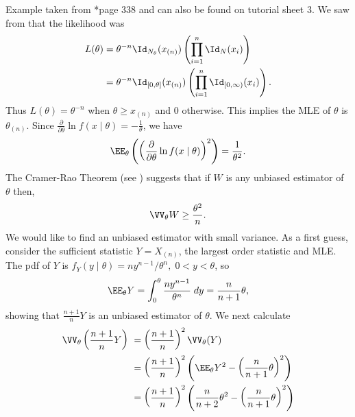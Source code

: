 \begin{exam} \label{exam: uni_ss_p2}
    Example taken from \cite{CasellaGeorge2001SI}*{page 338} and can also be found on tutorial sheet 3. We saw from  that the likelihood was
    \begin{align*}
        L (\theta) & = \theta^{-n} \Id_{N_\theta} (x_{(n)}) \left( \prod_{i=1}^{n} \Id_{N} (x_i) \right)             \\
                   & = \theta^{-n} \Id_{[0,\theta]} (x_{(n)}) \left( \prod_{i=1}^{n} \Id_{[0,\infty)} (x_i) \right).
    \end{align*}
    Thus $L (\theta) = \theta^{-n}$ when $\theta \geq x_{(n)}$ and $0$ otherwise. This implies the MLE of $\theta$ is $\theta_{(n)}$. Since $\frac{\partial}{\partial \theta} \ln f (x \mid \theta) = -\frac{1}{\theta}$, we have
    \begin{equation*}
        \EE_{\theta} \left( \left( \frac{\partial}{\partial \theta} \ln f (x \mid \theta) \right)^2 \right) = \frac{1}{\theta^2}.
    \end{equation*}
    The Cramer-Rao Theorem (see ) suggests that if $W$ is any unbiased estimator of $\theta$ then,
    \begin{equation*}
        \VV_\theta W \geq \frac{\theta^2}{n}.
    \end{equation*}
    We would like to find an unbiased estimator with small variance. As a first guess, consider the sufficient statistic $Y = X_{(n)}$, the largest order statistic and MLE. The pdf of $Y$ is $f_Y (y\mid \theta) = ny^{n-1} / \theta^n, \; 0 < y < \theta$, so
    \begin{equation*}
        \EE_{\theta} Y = \int_{0}^{\theta} \frac{ny^{n-1}}{\theta^n} \; dy = \frac{n}{n+1} \theta,
    \end{equation*}
    showing that $\frac{n+1}{n}Y$ is an unbiased estimator of $\theta$. We next calculate
    \begin{align*}
        \VV_{\theta} \left( \frac{n+1}{n} Y \right) \
         & = \left( \frac{n+1}{n} \right)^2 \VV_{\theta} (Y)                                                             \\
         & = \left( \frac{n+1}{n} \right)^2 \left( \EE_{\theta} Y^2 - \left( \frac{n}{n+1} \theta \right)^2 \right)      \\
         & = \left( \frac{n+1}{n} \right)^2 \left( \frac{n}{n+2}\theta^2 - \left( \frac{n}{n+1} \theta \right)^2 \right) \\

\end{align*}
\end{exam}
